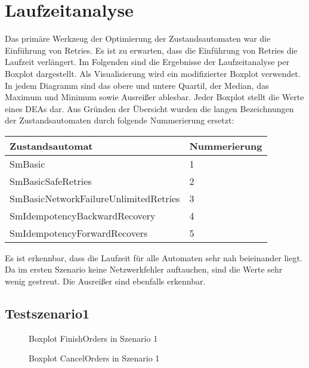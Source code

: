 \section{Laufzeitanalyse}

Das primäre Werkzeug der Optimierung der Zustandsautomaten war die Einführung von Retries. Es ist zu erwarten, dass die Einführung von Retries die Laufzeit verlängert. Im Folgenden sind die Ergebnisse der Laufzeitanalyse per Boxplot dargestellt. Als Visualisierung wird ein modifizierter Boxplot verwendet. In jedem Diagramm sind das obere und untere Quartil, der Median, das Maximum und Minimum sowie Ausreißer ablesbar. Jeder Boxplot stellt die Werte eines DEAs dar. Aus Gründen der Übersicht wurden die langen Bezeichnungen der Zustandsautomaten durch folgende Nummerierung ersetzt:

\begin{center}
	\begin{tabular}[h]{|p{8cm}|p{3cm}|}
		\hline
		Zustandsautomat & Nummerierung \\ \hline
		SmBasic & 1 \\ \hline
		SmBasicSafeRetries & 2 \\ \hline
		SmBasicNetworkFailureUnlimitedRetries & 3 \\ \hline
		SmIdempotencyBackwardRecovery & 4 \\ \hline		
		SmIdempotencyForwardRecovers & 5 \\ \hline
	\end{tabular}
\end{center}
\FloatBarrier

Es ist erkennbar, dass die Laufzeit für alle Automaten sehr nah beieinander liegt. Da im ersten Szenario keine Netzwerkfehler auftauchen, sind die Werte sehr wenig gestreut. Die Ausreißer sind ebenfalls erkennbar.

\subsection{Testszenario1}

\begin{figure}[!htbp]
\begin{minipage}{.45\textwidth}
	
	\caption{Boxplot FinishOrders in Szenario 1}
	\label{fig:boxplot_finishorders_scenario1}
\end{minipage}\hspace{\fill}%
\begin{minipage}{.45\textwidth}
	
	\caption{Boxplot CancelOrders in Szenario 1}
	\label{fig:boxplot_cancelorders_scenario1}
\end{minipage}
\end{figure}
\FloatBarrier

